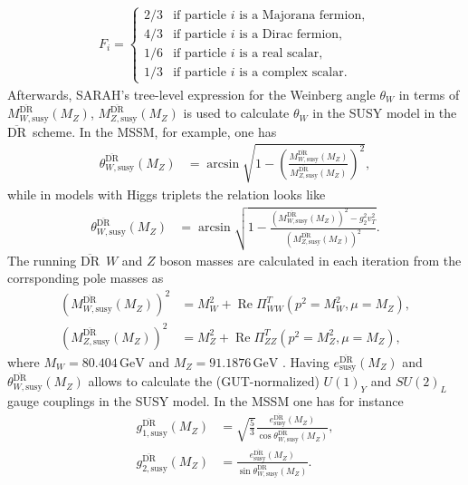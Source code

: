 \documentclass[final,3p,11pt,pdflatex]{elsarticle}
\newcommand{\textoverline}[1]{$\overline{\mbox{#1}}$}
\newcommand{\DRbar}{\textoverline{DR}\xspace}
\newcommand{\unit}[1]{\,\text{#1}}      %
\DeclareMathOperator{\re}{Re}
\begin{document}
%
\begin{align}
  F_i =
  \begin{cases}
    2/3 & \text{if particle $i$ is a Majorana fermion},\\
    4/3 & \text{if particle $i$ is a Dirac fermion},\\
    1/6 & \text{if particle $i$ is a real scalar},\\
    1/3 & \text{if particle $i$ is a complex scalar}.
  \end{cases}
\end{align}
%
Afterwards, SARAH's tree-level expression for the Weinberg angle
$\theta_W$ in terms of $M_{W,\text{susy}}^{\text{\DRbar}}(M_Z)$,
$M_{Z,\text{susy}}^{\text{\DRbar}}(M_Z)$ is used to calculate
$\theta_W$ in the SUSY model in the \DRbar\ scheme.  In the MSSM, for
example, one has
%
\begin{align}
  \theta_{W,\text{susy}}^{\text{\DRbar}}(M_Z) &= \arcsin\sqrt{1
    -
    \left(\frac{M_{W,\text{susy}}^{\text{\DRbar}}(M_Z)}{M_{Z,\text{susy}}^{\text{\DRbar}}(M_Z)}\right)^2}
  ,
\end{align}
%
while in models with Higgs triplets the relation looks like
%
\begin{align}
  \theta_{W,\text{susy}}^{\text{\DRbar}}(M_Z) &= \arcsin\sqrt{1 -
    \frac{\left(M_{W,\text{susy}}^{\text{\DRbar}}(M_Z)\right)^2 -
      g_2^2v_T^2}{\left(M_{Z,\text{susy}}^{\text{\DRbar}}(M_Z)\right)^2}}.
\end{align}
%
The running \DRbar\ $W$ and $Z$ boson masses are calculated in each
iteration from the corrsponding pole masses as
%
\begin{align}
  \left(M_{W,\text{susy}}^{\text{\DRbar}}(M_Z)\right)^2 &=
  M_W^2 + \re \Pi_{WW}^T(p^2 = M_W^2, \mu=M_Z) ,\\
  \left(M_{Z,\text{susy}}^{\text{\DRbar}}(M_Z)\right)^2 &=
  M_Z^2 + \re \Pi_{ZZ}^T(p^2 = M_Z^2, \mu=M_Z) ,
\end{align}
%
where $M_W = 80.404\unit{GeV}$ and $M_Z = 91.1876\unit{GeV}$
\cite{Beringer:1900zz}.  Having $e_{\text{susy}}^{\text{\DRbar}}(M_Z)$
and $\theta_{W,\text{susy}}^{\text{\DRbar}}(M_Z)$ allows to calculate
the (GUT-normalized) $U(1)_Y$ and $SU(2)_L$ gauge couplings in the
SUSY model.  In the MSSM one has for instance
%
\begin{align}
  g_{1,\text{susy}}^{\text{\DRbar}}(M_Z) &=
  \sqrt{\frac{5}{3}} \frac{e_{\text{susy}}^{\text{\DRbar}}(M_Z)}{\cos\theta_{W,\text{susy}}^{\text{\DRbar}}(M_Z)} ,\\
  g_{2,\text{susy}}^{\text{\DRbar}}(M_Z) &=
  \frac{e_{\text{susy}}^{\text{\DRbar}}(M_Z)}{\sin\theta_{W,\text{susy}}^{\text{\DRbar}}(M_Z)} .
\end{align}
\end{document}
